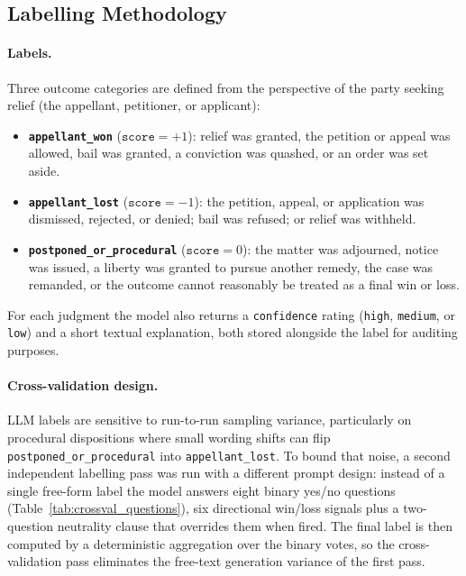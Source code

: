 \subsection{Labelling Methodology}
\label{sec:labelling_methodology}

\paragraph{Labels.}
Three outcome categories are defined from the perspective of the party seeking
relief (the appellant, petitioner, or applicant):

\begin{itemize}
  \item \textbf{\texttt{appellant\_won}} ($\texttt{score} = +1$): relief was
    granted, the petition or appeal was allowed, bail was granted, a conviction
    was quashed, or an order was set aside.
  \item \textbf{\texttt{appellant\_lost}} ($\texttt{score} = -1$): the petition,
    appeal, or application was dismissed, rejected, or denied; bail was refused;
    or relief was withheld.
  \item \textbf{\texttt{postponed\_or\_procedural}} ($\texttt{score} = 0$): the
    matter was adjourned, notice was issued, a liberty was granted to pursue
    another remedy, the case was remanded, or the outcome cannot reasonably be
    treated as a final win or loss.
\end{itemize}

For each judgment the model also returns a \texttt{confidence} rating
(\texttt{high}, \texttt{medium}, or \texttt{low}) and a short textual
explanation, both stored alongside the label for auditing purposes.

\paragraph{Cross-validation design.}
LLM labels are sensitive to run-to-run sampling variance, particularly on
procedural dispositions where small wording shifts can flip
\texttt{postponed\_or\_procedural} into \texttt{appellant\_lost}. To bound that
noise, a second independent labelling pass was run with a different prompt
design: instead of a single free-form label the model answers eight binary
yes/no questions (Table~\ref{tab:crossval_questions}), six directional
win/loss signals plus a two-question neutrality clause that overrides them
when fired. The final label is then computed by a deterministic aggregation
over the binary votes, so the cross-validation pass eliminates the
free-text generation variance of the first pass.

